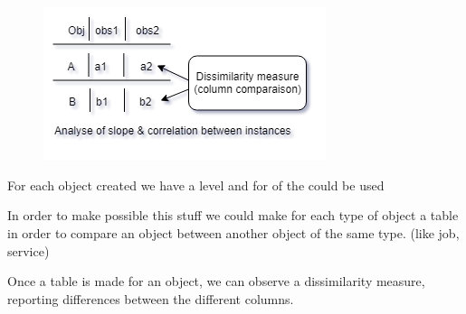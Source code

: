 \documentclass[12pt]{report}
\begin{document}
\begin{multicols}{2}


\begin{figure}[H]
	\begin{Center}
		\includegraphics[width=234.15pt,height=126.9pt]{./media/image15.png}
	\end{Center}
\end{figure}




For each object created we have a level and for of the  could be used\par\par

In order to make possible this stuff we could make for each type of object a table in order to compare an object between another object of the same type. (like job, service)\par

Once a table is made for an object, we can observe a dissimilarity measure, reporting differences between the different columns.\par

\end{multicols}
\end{document}
